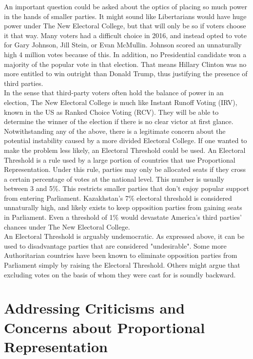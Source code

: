 \documentclass{article}
\begin{document}
    An important question could be asked about the optics of placing so much power in the hands of smaller parties. It might sound like Libertarians would have huge power under The New Electoral College, but that will only be so if voters choose it that way. Many voters had a difficult choice in 2016, and instead opted to vote for Gary Johnson, Jill Stein, or Evan McMullin. Johnson scored an unnaturally high 4 million votes because of this. In addition, no Presidential candidate won a majority of the popular vote in that election. That means Hillary Clinton was no more entitled to win outright than Donald Trump, thus justifying the presence of third parties.\\

    In the sense that third-party voters often hold the balance of power in an election, The New Electoral College is much like Instant Runoff Voting (IRV), known in the US as Ranked Choice Voting (RCV). They will be able to determine the winner of the election if there is no clear victor at first glance.\\

    Notwithstanding any of the above, there is a legitimate concern about the potential instability caused by a more divided Electoral College. If one wanted to make the problem less likely, an Electoral Threshold could be used. An Electoral Threshold is a rule used by a large portion of countries that use Proportional Representation. Under this rule, parties may only be allocated seats if they cross a certain percentage of votes at the national level. This number is usually between 3 and 5\%. This restricts smaller parties that don't enjoy popular support from entering Parliament. Kazakhstan's 7\% electoral threshold is considered unnaturally high, and likely exists to keep opposition parties from gaining seats in Parliament. Even a threshold of 1\% would devastate America's third parties' chances under The New Electoral College.\\

    An Electoral Threshold is arguably undemocratic. As expressed above, it can be used to disadvantage parties that are considered "undesirable". Some more Authoritarian countries have been known to eliminate opposition parties from Parliament simply by raising the Electoral Threshold. Others might argue that excluding votes on the basis of whom they were cast for is soundly backward.\\

    \section{Addressing Criticisms and Concerns about Proportional Representation}%
\end{document}
